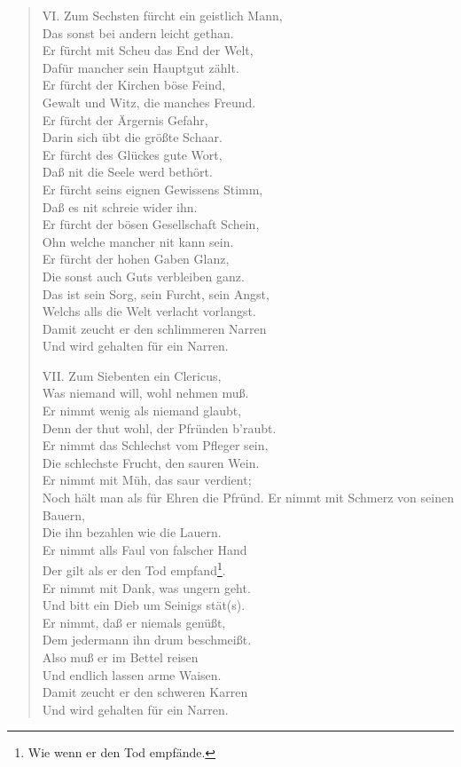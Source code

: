 \begin{verse}
VI. Zum Sechsten fürcht ein geistlich Mann,\\
Das sonst bei andern leicht gethan.\\
Er fürcht mit Scheu das End der Welt,\\
Dafür mancher sein Hauptgut zählt.\\
Er fürcht der Kirchen böse Feind,\\
Gewalt und Witz, die manches Freund.\\
Er fürcht der Ärgernis Gefahr,\\
Darin sich übt die größte Schaar.\\
Er fürcht des Glückes gute Wort,\\
Daß nit die Seele werd bethört.\\
Er fürcht seins eignen Gewissens Stimm,\\
Daß es nit schreie wider ihn.\\
Er fürcht der bösen Gesellschaft Schein,\\
Ohn welche mancher nit kann sein.\\
Er fürcht der hohen Gaben Glanz,\\
Die sonst auch Guts verbleiben ganz.\\
Das ist sein Sorg, sein Furcht, sein Angst,\\
Welchs alls die Welt verlacht vorlangst.\\
Damit zeucht er den schlimmeren Narren\\
Und wird gehalten für ein Narren.

VII. Zum Siebenten ein Clericus,\\
Was niemand will, wohl nehmen muß.\\
Er nimmt wenig als niemand glaubt,\\
Denn der thut wohl, der Pfründen b’raubt.\\
Er nimmt das Schlechst vom Pfleger sein,\\
Die schlechste Frucht, den sauren Wein.\\
Er nimmt mit Müh, das saur verdient;\\
Noch hält man als für Ehren die Pfründ.
Er nimmt mit Schmerz von seinen Bauern,\\
Die ihn bezahlen wie die Lauern.\\
Er nimmt alls Faul von falscher Hand\\
Der gilt als er den Tod empfand\footnote{Wie wenn er den Tod empfände.}.\\
Er nimmt mit Dank, was ungern geht.\\
Und bitt ein Dieb um Seinigs stät(s).\\
Er nimmt, daß er niemals genüßt,\\
Dem jedermann ihn drum beschmeißt.\\
Also muß er im Bettel reisen\\
Und endlich lassen arme Waisen.\\
Damit zeucht er den schweren Karren\\
Und wird gehalten für ein Narren.
\end{verse}

